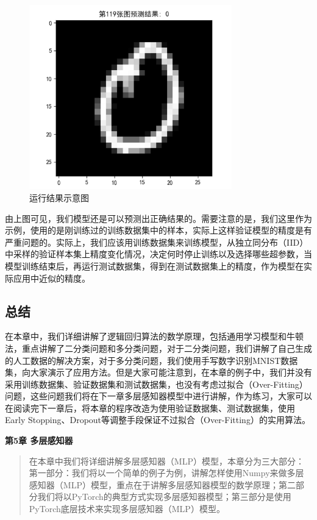 \documentclass[UTF8]{article}
\begin{document}
\begin{figure}[H]
	\caption{运行结果示意图}
	\label{f000034}
	\centering
	\includegraphics[height=8cm]{images/f000034}
\end{figure}
由上图可见，我们模型还是可以预测出正确结果的。需要注意的是，我们这里作为示例，使用的是刚训练过的训练数据集中的样本，实际上这样验证模型的精度是有严重问题的。实际上，我们应该用训练数据集来训练模型，从独立同分布（IID）中采样的验证样本集上精度变化情况，决定何时停止训练以及选择哪些超参数，当模型训练结束后，再运行测试数据集，得到在测试数据集上的精度，作为模型在实际应用中近似的精度。
\subsection{总结}
在本章中，我们详细讲解了逻辑回归算法的数学原理，包括通用学习模型和牛顿法，重点讲解了二分类问题和多分类问题，对于二分类问题，我们讲解了自己生成的人工数据的解决方案，对于多分类问题，我们使用手写数字识别MNIST数据集，向大家演示了应用方法。但是大家可能注意到，在本章的例子中，我们并没有采用训练数据集、验证数据集和测试数据集，也没有考虑过拟合（Over-Fitting）问题，这些问题我们将在下一章多层感知器模型中进行讲解，作为练习，大家可以在阅读完下一章后，将本章的程序改造为使用验证数据集、测试数据集，使用Early Stopping、Dropout等调整手段保证不过拟合（Over-Fitting）的实用算法。


\newpage
\maketitle
\begin{center}
\Large \textbf{第5章 多层感知器} \quad \textbf{}
\end{center}
\begin{abstract}
在本章中我们将详细讲解多层感知器（MLP）模型，本章分为三大部分：第一部分：我们将以一个简单的例子为例，讲解怎样使用Numpy来做多层感知器（MLP）模型，重点在于讲解多层感知器模型的数学原理；第二部分我们将以PyTorch的典型方式实现多层感知器模型；第三部分是使用PyTorch底层技术来实现多层感知器（MLP）模型。
\end{abstract}
\end{document}
